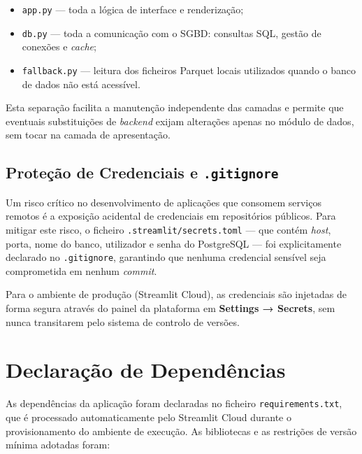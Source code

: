 \documentclass[12pt,a4paper]{report}
\begin{document}
\begin{itemize}
    \item \texttt{app.py} — toda a lógica de interface e renderização;
    \item \texttt{db.py} — toda a comunicação com o SGBD: consultas SQL, gestão de
    conexões e \textit{cache};
    \item \texttt{fallback.py} — leitura dos ficheiros Parquet locais utilizados
    quando o banco de dados não está acessível.
\end{itemize}

Esta separação facilita a manutenção independente das camadas e permite que eventuais
substituições de \textit{backend} exijam alterações apenas no módulo de dados, sem
tocar na camada de apresentação.

\subsection{Proteção de Credenciais e \texttt{.gitignore}}

Um risco crítico no desenvolvimento de aplicações que consomem serviços remotos é a
exposição acidental de credenciais em repositórios públicos. Para mitigar este risco, o
ficheiro \texttt{.streamlit/secrets.toml} — que contém \textit{host}, porta, nome do
banco, utilizador e senha do PostgreSQL — foi explicitamente declarado no
\texttt{.gitignore}, garantindo que nenhuma credencial sensível seja comprometida
em nenhum \textit{commit}.

Para o ambiente de produção (Streamlit Cloud), as credenciais são injetadas de forma
segura através do painel da plataforma em \textbf{Settings → Secrets}, sem nunca
transitarem pelo sistema de controlo de versões.

\section{Declaração de Dependências}

As dependências da aplicação foram declaradas no ficheiro \texttt{requirements.txt},
que é processado automaticamente pelo Streamlit Cloud durante o provisionamento do
ambiente de execução. As bibliotecas e as restrições de versão mínima adotadas foram:
\end{document}
